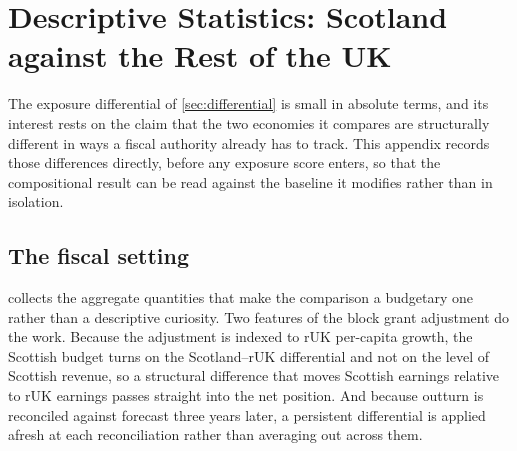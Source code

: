 \section{Descriptive Statistics: Scotland against the Rest of the UK}\label{app:descriptives}

The exposure differential of \cref{sec:differential} is small in absolute terms, and its interest rests on the claim that the two economies it compares are structurally different in ways a fiscal authority already has to track. This appendix records those differences directly, before any exposure score enters, so that the compositional result can be read against the baseline it modifies rather than in isolation.

\subsection{The fiscal setting}

 collects the aggregate quantities that make the comparison a budgetary one rather than a descriptive curiosity. Two features of the block grant adjustment do the work. Because the adjustment is indexed to rUK per-capita growth, the Scottish budget turns on the Scotland--rUK differential and not on the level of Scottish revenue, so a structural difference that moves Scottish earnings relative to rUK earnings passes straight into the net position. And because outturn is reconciled against forecast three years later, a persistent differential is applied afresh at each reconciliation rather than averaging out across them.

